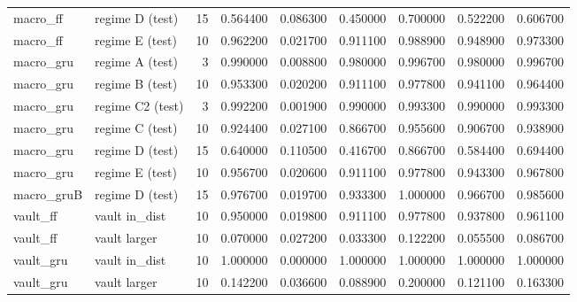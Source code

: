 \begin{tabular}{llrrrrrrr}
macro\_ff & regime D (test) & 15 & 0.564400 & 0.086300 & 0.450000 & 0.700000 & 0.522200 & 0.606700 \\
macro\_ff & regime E (test) & 10 & 0.962200 & 0.021700 & 0.911100 & 0.988900 & 0.948900 & 0.973300 \\
macro\_gru & regime A (test) & 3 & 0.990000 & 0.008800 & 0.980000 & 0.996700 & 0.980000 & 0.996700 \\
macro\_gru & regime B (test) & 10 & 0.953300 & 0.020200 & 0.911100 & 0.977800 & 0.941100 & 0.964400 \\
macro\_gru & regime C2 (test) & 3 & 0.992200 & 0.001900 & 0.990000 & 0.993300 & 0.990000 & 0.993300 \\
macro\_gru & regime C (test) & 10 & 0.924400 & 0.027100 & 0.866700 & 0.955600 & 0.906700 & 0.938900 \\
macro\_gru & regime D (test) & 15 & 0.640000 & 0.110500 & 0.416700 & 0.866700 & 0.584400 & 0.694400 \\
macro\_gru & regime E (test) & 10 & 0.956700 & 0.020600 & 0.911100 & 0.977800 & 0.943300 & 0.967800 \\
macro\_gruB & regime D (test) & 15 & 0.976700 & 0.019700 & 0.933300 & 1.000000 & 0.966700 & 0.985600 \\
vault\_ff & vault in\_dist & 10 & 0.950000 & 0.019800 & 0.911100 & 0.977800 & 0.937800 & 0.961100 \\
vault\_ff & vault larger & 10 & 0.070000 & 0.027200 & 0.033300 & 0.122200 & 0.055500 & 0.086700 \\
vault\_gru & vault in\_dist & 10 & 1.000000 & 0.000000 & 1.000000 & 1.000000 & 1.000000 & 1.000000 \\
vault\_gru & vault larger & 10 & 0.142200 & 0.036600 & 0.088900 & 0.200000 & 0.121100 & 0.163300 \\
\bottomrule
\end{tabular}
